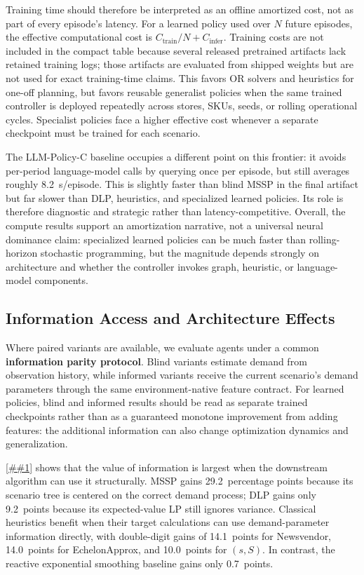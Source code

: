 \documentclass[10pt,a4paper]{article}
\providecommand{\Cref}[1]{\ref{##1}}
\begin{document}
Training time should therefore be interpreted as an offline amortized
cost, not as part of every episode's latency. For a learned policy used
over $N$ future episodes, the effective computational cost is
$C_{\mathrm{train}}/N + C_{\mathrm{infer}}$. Training costs are not
included in the compact table because several released pretrained
artifacts lack retained training logs; those artifacts are evaluated from
shipped weights but are not used for exact training-time claims. This
favors OR solvers and heuristics for one-off planning, but favors
reusable generalist policies when the same trained controller is deployed
repeatedly across stores, SKUs, seeds, or rolling operational cycles.
Specialist policies face a higher effective cost whenever a separate
checkpoint must be trained for each scenario.

The LLM-Policy-C baseline occupies a different point on this frontier:
it avoids per-period language-model calls by querying once per episode,
but still averages roughly 8.2~s/episode. This is slightly faster than
blind MSSP in the final artifact but far slower than DLP, heuristics, and
specialized learned policies. Its role is therefore diagnostic and
strategic rather than latency-competitive. Overall, the
compute results support an amortization narrative, not a universal
neural dominance claim: specialized learned policies can be much faster
than rolling-horizon stochastic programming, but the magnitude depends
strongly on architecture and whether the controller invokes graph,
heuristic, or language-model components.

\subsection{Information Access and Architecture Effects}

Where paired variants are available, we evaluate agents under a common
\textbf{information parity protocol}. Blind variants estimate demand
from observation history, while informed variants receive the current
scenario's demand parameters through the same environment-native feature
contract. For learned policies, blind and informed results should be
read as separate trained checkpoints rather than as a guaranteed
monotone improvement from adding features: the additional information
can also change optimization dynamics and generalization.

\Cref{tab:info_value} shows that the value of information is largest
when the downstream algorithm can use it structurally. MSSP gains
29.2~percentage points because its scenario tree is centered on the
correct demand process; DLP gains only 9.2~points because its
expected-value LP still ignores variance. Classical heuristics benefit
when their target calculations can use demand-parameter information
directly, with double-digit gains of 14.1~points for Newsvendor,
14.0~points for EchelonApprox, and 10.0~points for $(s,S)$. In contrast,
the reactive exponential smoothing baseline gains only 0.7~points.
\end{document}
